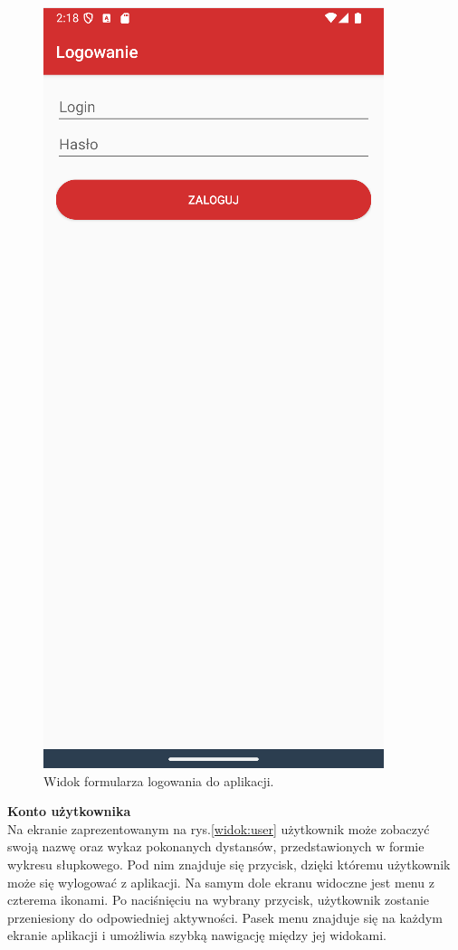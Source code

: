 \begin{figure}[H]
    \centering
    \includegraphics[scale=0.6]{img/imp/widok-log.png}
    \caption{Widok formularza logowania do aplikacji.}
    \label{widok:login}
\end{figure}
\newpage
\noindent
\textbf{Konto użytkownika} \\
\indent Na ekranie zaprezentowanym na rys.\ref{widok:user} użytkownik może zobaczyć swoją nazwę oraz wykaz pokonanych dystansów, przedstawionych w formie wykresu słupkowego. Pod nim znajduje się przycisk, dzięki któremu użytkownik może się wylogować z aplikacji. Na samym dole ekranu widoczne jest menu z czterema ikonami. Po naciśnięciu na wybrany przycisk, użytkownik zostanie przeniesiony do odpowiedniej aktywności. Pasek menu znajduje się na każdym ekranie aplikacji i umożliwia szybką nawigację między jej widokami.\\
